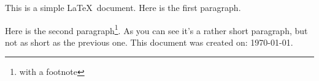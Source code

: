 \documentclass[12pt]{scrartcl}
\begin{document}
This is a simple \LaTeX\ document. Here is the first paragraph.

Here is the second paragraph\footnote{with a footnote}. As you
can see it's a rather short paragraph, but not as short as the
previous one. This document was created on: \today.
\end{document}
